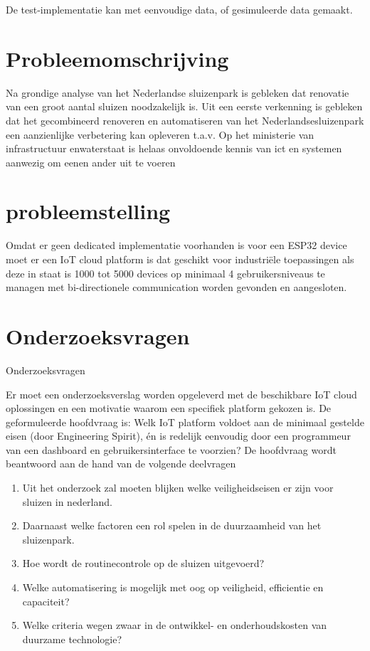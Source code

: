 De test-implementatie kan met eenvoudige data, of gesimuleerde data gemaakt. 
\section{Probleemomschrijving}


Na grondige analyse van het Nederlandse sluizenpark is gebleken dat renovatie van een groot aantal sluizen noodzakelijk is.  Uit een eerste verkenning is gebleken  dat het gecombineerd renoveren en automatiseren van het Nederlandsesluizenpark een aanzienlijke verbetering kan opleveren t.a.v. 
Op  het  ministerie  van  infrastructuur  enwaterstaat is helaas onvoldoende kennis van ict en systemen aanwezig om eenen ander uit te voeren 


\section{probleemstelling}
Omdat er geen dedicated  implementatie voorhanden is voor een ESP32 device moet er een IoT cloud platform is dat geschikt voor industriële toepassingen als deze in staat is 1000 tot 5000 devices op minimaal 4 gebruikersniveaus te managen met bi-directionele communication worden gevonden en aangesloten.

\section{Onderzoeksvragen}
Onderzoeksvragen

Er moet een onderzoeksverslag worden opgeleverd met de beschikbare IoT cloud oplossingen en een motivatie waarom een specifiek platform gekozen is. De geformuleerde hoofdvraag is:
Welk IoT platform voldoet aan de minimaal gestelde eisen (door Engineering Spirit), én is redelijk eenvoudig door een programmeur van een dashboard en gebruikersinterface te voorzien?
De hoofdvraag wordt beantwoord aan de hand van de volgende deelvragen




\begin{enumerate}
	\item Uit het onderzoek zal moeten blijken welke veiligheidseisen er zijn voor sluizen in nederland. 
	\item Daarnaast welke factoren een rol spelen in de duurzaamheid van het sluizenpark.  
	\item Hoe wordt de routinecontrole op de sluizen uitgevoerd?  
	\item Welke automatisering is mogelijk met oog op veiligheid, efficientie en capaciteit?  
	\item Welke criteria wegen zwaar in de ontwikkel- en onderhoudskosten van duurzame technologie?
\end{enumerate}



